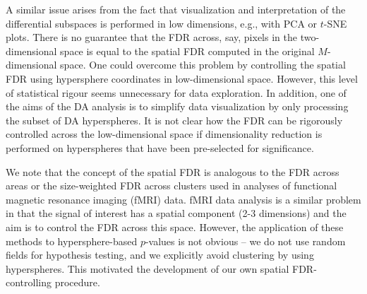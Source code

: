 \documentclass{article}
\begin{document}
A similar issue arises from the fact that visualization and interpretation of the differential subspaces is performed in low dimensions, e.g., with PCA or $t$-SNE plots.
There is no guarantee that the FDR across, say, pixels in the two-dimensional space is equal to the spatial FDR computed in the original $M$-dimensional space.
One could overcome this problem by controlling the spatial FDR using hypersphere coordinates in low-dimensional space.
However, this level of statistical rigour seems unnecessary for data exploration.
In addition, one of the aims of the DA analysis is to simplify data visualization by only processing the subset of DA hyperspheres.
It is not clear how the FDR can be rigorously controlled across the low-dimensional space if dimensionality reduction is performed on hyperspheres that have been pre-selected for significance.

We note that the concept of the spatial FDR is analogous to the FDR across areas \cite{pacifico2004false} or the size-weighted FDR across clusters \cite{benjamini2007false} used in analyses of functional magnetic resonance imaging (fMRI) data.
fMRI data analysis is a similar problem in that the signal of interest has a spatial component (2-3 dimensions) and the aim is to control the FDR across this space.
However, the application of these methods to hypersphere-based $p$-values is not obvious -- we do not use random fields for hypothesis testing, and we explicitly avoid clustering by using hyperspheres.
This motivated the development of our own spatial FDR-controlling procedure.
\end{document}
